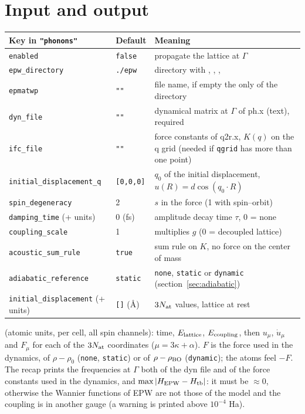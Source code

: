\documentclass[11pt]{article}
\begin{document}
\section{Input and output}
\begin{center}
\small
\begin{tabularx}{\textwidth}{@{}p{5.2cm}p{2.6cm}L@{}}
\toprule
Key in \texttt{"phonons"} & Default & Meaning \\
\midrule
\texttt{enabled} & \texttt{false} & propagate the lattice at $\Gamma$ \\
\texttt{epw\_directory} & \texttt{./epw} & directory with , , ,  \\
\texttt{epmatwp} & \texttt{""} & file name, if empty the only  of the directory \\
\texttt{dyn\_file} & \texttt{""} & dynamical matrix at $\Gamma$ of ph.x (text), required \\
\texttt{ifc\_file} & \texttt{""} & force constants of q2r.x, $K(q)$ on the q grid (needed if \texttt{qgrid} has more than one point) \\
\texttt{initial\_displacement\_q} & \texttt{[0,0,0]} & $q_0$ of the initial displacement, $u(R) = d\cos(q_0\cdot R)$ \\
\texttt{spin\_degeneracy} & 2 & $s$ in the force (1 with spin--orbit) \\
\texttt{damping\_time} (+ units) & 0 (fs) & amplitude decay time $\tau$, 0 = none \\
\texttt{coupling\_scale} & 1 & multiplies $g$ (0 = decoupled lattice) \\
\texttt{acoustic\_sum\_rule} & \texttt{true} & sum rule on $K$, no force on the center of mass \\
\texttt{adiabatic\_reference} & \texttt{static} & \texttt{none}, \texttt{static} or \texttt{dynamic} (section~\ref{sec:adiabatic}) \\
\texttt{initial\_displacement} (+ units) & \texttt{[]} (\AA) & $3N_{\rm at}$ values, lattice at rest \\
\bottomrule
\end{tabularx}
\end{center}

 (atomic units, per cell, all spin channels): time, $E_{\rm lattice}$, $E_{\rm coupling}$, then $u_\mu$,
$\dot u_\mu$ and $F_\mu$ for each of the $3N_{\rm at}$ coordinates ($\mu=3\kappa+\alpha$). $F$ is the force used in the
dynamics, of $\rho-\rho_0$ (\texttt{none}, \texttt{static}) or of $\rho-\rho_{\rm BO}$ (\texttt{dynamic}); the atoms feel $-F$.
The recap prints the frequencies at $\Gamma$ both of the dyn file and of the force constants used in the dynamics, and
$\max|H_{\rm EPW}-H_{\rm tb}|$: it must be $\approx 0$, otherwise the Wannier functions of EPW are not those of the model
and the coupling is in another gauge (a warning is printed above $10^{-4}$ Ha).
\end{document}

